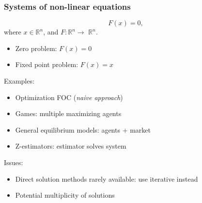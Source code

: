 \documentclass[bigger]{beamer}
\begin{document}
\begin{frame}%
\frametitle{Systems of non-linear equations }

\begin{equation*}
F(x)=0,
\end{equation*}%
where $x\in \mathbb{R}^{n}$, and $F:\mathbb{R}^{n}\rightarrow $ $\mathbb{R}%
^{n}$.

\begin{itemize}
\item Zero problem: $F(x)=0$

\item Fixed point problem: $F(x)=x$
\end{itemize}

Examples:

\begin{itemize}
\item Optimization FOC (\emph{naive approach})

\item Games: multiple maximizing agents

\item General equilibrium models: agents + market

\item Z-estimators: estimator solves system
\end{itemize}

Issues:

\begin{itemize}
\item Direct solution methods rarely available: use iterative instead

\item Potential multiplicity of solutions
\end{itemize}


\end{frame}%
\end{document}
